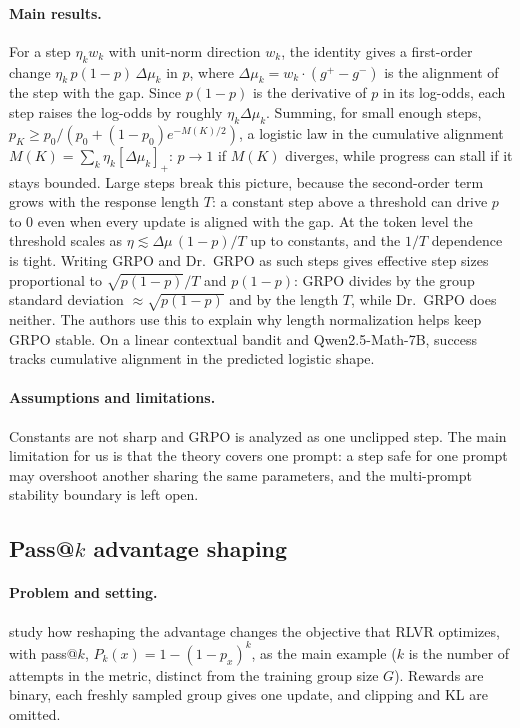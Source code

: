\documentclass{article}
\theoremstyle{definition}
\newcommand{\1}{\mathbf{1}}
\begin{document}
\paragraph{Main results.}
For a step $\eta_k w_k$ with unit-norm direction $w_k$, the identity
gives a first-order change $\eta_k\,p(1-p)\,\Delta\mu_k$ in $p$, where
$\Delta\mu_k=w_k\cdot(g^+-g^-)$ is the alignment of the step with the
gap. Since $p(1-p)$ is the derivative of $p$ in its log-odds, each step
raises the log-odds by roughly $\eta_k\Delta\mu_k$. Summing, for small
enough steps, $p_K\ge p_0/(p_0+(1-p_0)e^{-M(K)/2})$, a logistic law in the
cumulative alignment $M(K)=\sum_k\eta_k[\Delta\mu_k]_+$: $p\to1$ if
$M(K)$ diverges, while progress can stall if it stays bounded. Large
steps break this picture, because the second-order term grows with the
response length $T$: a constant step above a threshold can drive $p$ to
$0$ even when every update is aligned with the gap. At the token level
the threshold scales as $\eta\lesssim\Delta\mu\,(1-p)/T$ up to
constants, and the $1/T$ dependence is tight. Writing GRPO and Dr.\ GRPO
as such steps gives effective step sizes proportional to
$\sqrt{p(1-p)}/T$ and $p(1-p)$: GRPO divides by the group standard
deviation $\approx\sqrt{p(1-p)}$ and by the length $T$, while Dr.\ GRPO
does neither. The authors use this to explain why length normalization
helps keep GRPO stable. On a linear contextual bandit and
Qwen2.5-Math-7B, success tracks cumulative alignment in the predicted
logistic shape.

\paragraph{Assumptions and limitations.}
Constants are not sharp and GRPO is analyzed as one unclipped step.
The main limitation for us is that the theory covers one prompt: a step safe for one
prompt may overshoot another sharing the same parameters, and the
multi-prompt stability boundary is left open.

\subsection{\texorpdfstring{Pass@$k$ advantage shaping~\citep{thrampoulidis2026passk}}{Pass@k advantage shaping (Thrampoulidis et al.)}}
\label{sec:thrampoulidis}

\paragraph{Problem and setting.}
\citet{thrampoulidis2026passk} study how reshaping the advantage changes
the objective that RLVR optimizes, with pass@$k$, $P_k(x)=1-(1-p_x)^k$,
as the main example ($k$ is the number of attempts in the metric, distinct
from the training group size $G$). Rewards are binary, each freshly
sampled group gives one update, and clipping and KL are omitted.
\end{document}
